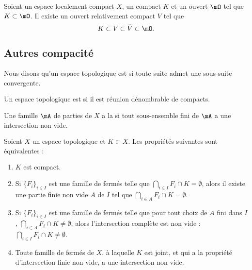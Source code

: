 \begin{lemma}       \label{LEMooKYMKooPxZjWN}
	Soient un espace localement compact \( X\), un compact \( K\) et un ouvert \( \mO\) tel que \( K\subset \mO\). Il existe un ouvert relativement compact \( V\) tel que
	\begin{equation}
		K\subset V\subset \bar V\subset \mO.
	\end{equation}
\end{lemma}

\subsection{Autres compacité}

\begin{definition}        \label{DEFooTVDOooZbwOFK}
	Nous disons qu'un espace topologique est  si toute suite admet une sous-suite convergente.
\end{definition}

\begin{definition}      \label{DefFCGBooLpnSAK}
	Un espace topologique est  si il est réunion dénombrable de compacts.
\end{definition}

\begin{definition}
	Une famille \( \mA\) de parties de \( X\) a la  si tout sous-ensemble fini de \( \mA\) a une intersection non vide.
\end{definition}

\begin{proposition}\label{PropXKUMiCj}
	Soient \( X\) un espace topologique et \( K\subset X\). Les propriétés suivantes sont équivalentes :
	\begin{enumerate}
		\item\label{ItemXYmGHFai}
		\( K\) est compact.
		\item\label{ItemXYmGHFaii}
		Si \( \{ F_i \}_{i\in I}\) est une famille de fermés telle que \( \bigcap_{i\in I}F_i \cap K =\emptyset\), alors il existe une partie finie non vide \( A\) de \( I\) tel que \( \bigcap_{i\in A}F_i \cap K =\emptyset\).
		\item\label{ItemXYmGHFaiii}
		Si \( \{ F_i \}_{i\in I}\) est une famille de fermés telle que pour tout choix de \( A\) fini dans \( I\), \( \bigcap_{i\in A}F_i \cap K \neq\emptyset\), alors l'intersection complète est non vide : \( \bigcap_{i\in I}F_i \cap K\neq\emptyset\).
		\item\label{ItemXYmGHFaiv}
		Toute famille de fermés de \( X \), à laquelle \( K \) est joint, et qui a la propriété d'intersection finie non vide, a une intersection non vide.
	\end{enumerate}
\end{proposition}

